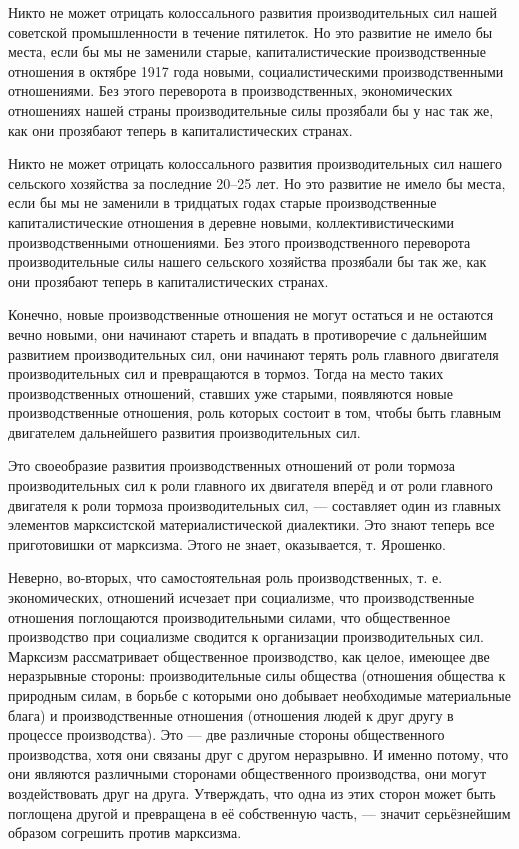 \documentclass[12pt, a4paper, openany]{book}
\begin{document}
Никто не может отрицать колоссального развития производительных сил нашей советской промышленности в течение пятилеток. Но это развитие не имело бы места, если бы мы не заменили старые, капиталистические производственные отношения в октябре 1917 года новыми, социалистическими производственными отношениями. Без этого переворота в производственных, экономических отношениях нашей страны производительные силы прозябали бы у нас так же, как они прозябают теперь в капиталистических странах.



Никто не может отрицать колоссального развития производительных сил нашего сельского хозяйства за последние 20–25 лет. Но это развитие не имело бы места, если бы мы не заменили в тридцатых годах старые производственные капиталистические отношения в деревне новыми, коллективистическими производственными отношениями. Без этого производственного переворота производительные силы нашего сельского хозяйства прозябали бы так же, как они прозябают теперь в капиталистических странах.

Конечно, новые производственные отношения не могут остаться и не остаются вечно новыми, они начинают стареть и впадать в противоречие с дальнейшим развитием производительных сил, они начинают терять роль главного двигателя производительных сил и превращаются в тормоз. Тогда на место таких производственных отношений, ставших уже старыми, появляются новые производственные отношения, роль которых состоит в том, чтобы быть главным двигателем дальнейшего развития производительных сил.

Это своеобразие развития производственных отношений от роли тормоза производительных сил к роли главного их двигателя вперёд и от роли главного двигателя к роли тормоза производительных сил, — составляет один из главных элементов марксистской материалистической диалектики. Это знают теперь все приготовишки от марксизма. Этого не знает, оказывается, т. Ярошенко.

Неверно, во-вторых, что самостоятельная роль производственных, т. е. экономических, отношений исчезает при социализме, что производственные отношения поглощаются производительными силами, что общественное производство при социализме сводится к организации производительных сил. Марксизм рассматривает общественное производство, как целое, имеющее две неразрывные стороны: производительные силы общества (отношения общества к природным силам, в борьбе с которыми оно добывает необходимые материальные блага) и производственные отношения (отношения людей к друг другу в процессе производства). Это — две различные стороны общественного производства, хотя они связаны друг с другом неразрывно. И именно потому, что они являются различными сторонами общественного производства, они могут воздействовать друг на друга. Утверждать, что одна из этих сторон может быть поглощена другой и превращена в её собственную часть, — значит серьёзнейшим образом согрешить против марксизма.
\end{document}
